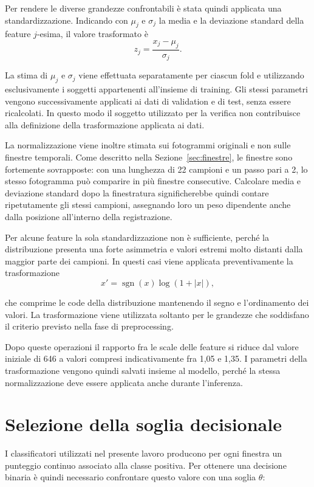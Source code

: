Per rendere le diverse grandezze confrontabili è stata quindi applicata una standardizzazione. Indicando con $\mu_j$ e $\sigma_j$ la media e la deviazione standard della feature $j$-esima, il valore trasformato è
\[
z_j =
\frac{x_j-\mu_j}{\sigma_j}.
\]

La stima di $\mu_j$ e $\sigma_j$ viene effettuata separatamente per ciascun fold e utilizzando esclusivamente i soggetti appartenenti all'insieme di training. Gli stessi parametri vengono successivamente applicati ai dati di validation e di test, senza essere ricalcolati. In questo modo il soggetto utilizzato per la verifica non contribuisce alla definizione della trasformazione applicata ai dati.

La normalizzazione viene inoltre stimata sui fotogrammi originali e non sulle finestre temporali. Come descritto nella Sezione~\ref{sec:finestre}, le finestre sono fortemente sovrapposte: con una lunghezza di 22 campioni e un passo pari a 2, lo stesso fotogramma può comparire in più finestre consecutive. Calcolare media e deviazione standard dopo la finestratura significherebbe quindi contare ripetutamente gli stessi campioni, assegnando loro un peso dipendente anche dalla posizione all'interno della registrazione.

Per alcune feature la sola standardizzazione non è sufficiente, perché la distribuzione presenta una forte asimmetria e valori estremi molto distanti dalla maggior parte dei campioni. In questi casi viene applicata preventivamente la trasformazione
\[
x' =
\operatorname{sgn}(x)\log(1+|x|),
\]

che comprime le code della distribuzione mantenendo il segno e l'ordinamento dei valori. La trasformazione viene utilizzata soltanto per le grandezze che soddisfano il criterio previsto nella fase di preprocessing.

Dopo queste operazioni il rapporto fra le scale delle feature si riduce dal valore iniziale di 646 a valori compresi indicativamente fra 1,05 e 1,35. I parametri della trasformazione vengono quindi salvati insieme al modello, perché la stessa normalizzazione deve essere applicata anche durante l'inferenza.

\section{Selezione della soglia decisionale}
\label{sec:soglia}

I classificatori utilizzati nel presente lavoro producono per ogni finestra un punteggio continuo associato alla classe positiva. Per ottenere una decisione binaria è quindi necessario confrontare questo valore con una soglia $\theta$:

